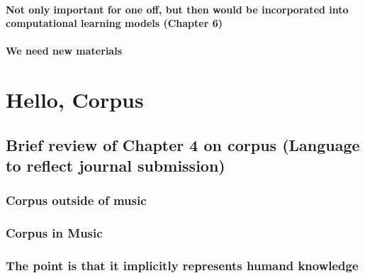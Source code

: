\documentclass[]{book}
\theoremstyle{definition}
\theoremstyle{definition}
\theoremstyle{definition}
\theoremstyle{remark}
\begin{document}
\hypertarget{not-only-important-for-one-off-but-then-would-be-incorporated-into-computational-learning-models-chapter-6}{%
\subsubsection{Not only important for one off, but then would be
incorporated into computational learning models (Chapter
6)}\label{not-only-important-for-one-off-but-then-would-be-incorporated-into-computational-learning-models-chapter-6}}

\hypertarget{we-need-new-materials}{%
\subsubsection{We need new materials}\label{we-need-new-materials}}

\hypertarget{hello-corpus}{%
\chapter{Hello, Corpus}\label{hello-corpus}}

\hypertarget{brief-review-of-chapter-4-on-corpus-language-to-reflect-journal-submission}{%
\section{Brief review of Chapter 4 on corpus (Language to reflect
journal
submission)}\label{brief-review-of-chapter-4-on-corpus-language-to-reflect-journal-submission}}

\hypertarget{corpus-outside-of-music}{%
\subsection{Corpus outside of music}\label{corpus-outside-of-music}}

\hypertarget{corpus-in-music}{%
\subsection{Corpus in Music}\label{corpus-in-music}}

\hypertarget{the-point-is-that-it-implicitly-represents-humand-knowledge}{%
\subsection{The point is that it implicitly represents humand
knowledge}\label{the-point-is-that-it-implicitly-represents-humand-knowledge}}
\end{document}

